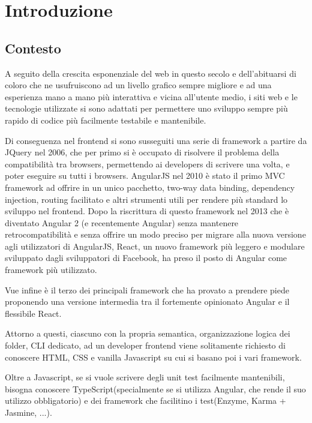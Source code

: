 \chapter{Introduzione}\label{cap:introduzione}

\section{Contesto}\label{sez:contesto}

A seguito della crescita esponenziale del web in questo secolo e dell'abituarsi di coloro che ne usufruiscono ad un livello grafico sempre migliore e ad una esperienza mano a mano pi\`u interattiva e vicina all'utente medio, i siti web e le tecnologie utilizzate si sono adattati per permettere uno sviluppo sempre pi\`u rapido di codice pi\`u facilmente testabile e mantenibile.

Di conseguenza nel frontend si sono susseguiti una serie di framework a partire da JQuery nel 2006, che per primo si \`e occupato di risolvere il problema della compatibilit\`a tra browsers, permettendo ai developers di scrivere una volta, e poter eseguire su tutti i browsers.
AngularJS nel 2010 \`e stato il primo MVC framework ad offrire in un unico pacchetto, two-way data binding, dependency injection, routing facilitato e altri strumenti utili per rendere pi\`u standard lo sviluppo nel frontend.
Dopo la riscrittura di questo framework nel 2013 che \`e diventato Angular 2 (e recentemente Angular) senza mantenere retrocompatibilit\`a e senza offrire un modo preciso per migrare alla nuova versione agli utilizzatori di AngularJS, React, un nuovo framework pi\`u leggero e modulare sviluppato dagli sviluppatori di Facebook, ha preso il posto di Angular come framework pi\`u utilizzato.

Vue infine \`e il terzo dei principali framework che ha provato a prendere piede proponendo una versione intermedia tra il fortemente opinionato Angular e il flessibile React.

Attorno a questi, ciascuno con la propria semantica, organizzazione logica dei folder, CLI dedicato, ad un developer frontend viene solitamente richiesto di conoscere HTML, CSS e vanilla Javascript su cui si basano poi i vari framework.

Oltre a Javascript, se si vuole scrivere degli unit test facilmente mantenibili, bisogna conoscere TypeScript(specialmente se si utilizza Angular, che rende il suo utilizzo obbligatorio) e dei framework che facilitino i test(Enzyme, Karma + Jasmine, ...).


